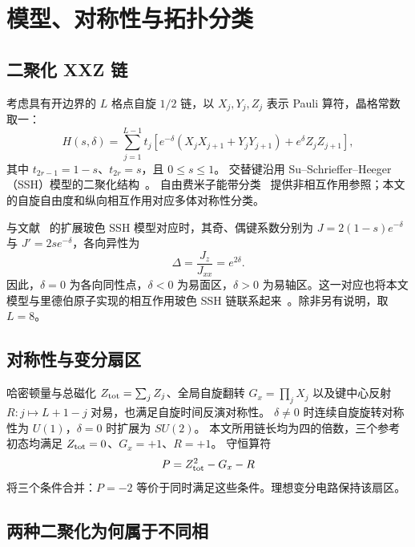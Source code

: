 \section{模型、对称性与拓扑分类}
\label{sec:model}

\subsection{二聚化 XXZ 链}

考虑具有开边界的 $L$ 格点自旋 $1/2$ 链，以 $X_j,Y_j,Z_j$ 表示 Pauli 算符，晶格常数取一：
\begin{equation}
H(s,\delta)=\sum_{j=1}^{L-1}t_j
\left[e^{-\delta}(X_jX_{j+1}+Y_jY_{j+1})
+e^\delta Z_jZ_{j+1}\right],
\label{eq:H}
\end{equation}
其中 $t_{2r-1}=1-s$、$t_{2r}=s$，且 $0\leq s\leq1$。
交替键沿用 Su--Schrieffer--Heeger（SSH）模型的二聚化结构~\cite{su1979solitons}。
自由费米子能带分类~\cite{ryu2010topological} 提供非相互作用参照；本文的自旋自由度和纵向相互作用对应多体对称性分类。

与文献~\cite{elben2020manybody} 的扩展玻色 SSH 模型对应时，其奇、偶键系数分别为 $J=2(1-s)e^{-\delta}$ 与 $J'=2se^{-\delta}$，各向异性为
\begin{equation}
\Delta=\frac{J_z}{J_{xx}}=e^{2\delta}.
\label{eq:anisotropy}
\end{equation}
因此，$\delta=0$ 为各向同性点，$\delta<0$ 为易面区，$\delta>0$ 为易轴区。这一对应也将本文模型与里德伯原子实现的相互作用玻色 SSH 链联系起来~\cite{deleseleuc2019observation}。除非另有说明，取 $L=8$。

\subsection{对称性与变分扇区}

哈密顿量与总磁化 $Z_{\rm tot}=\sum_jZ_j$、全局自旋翻转 $G_x=\prod_jX_j$ 以及键中心反射 $R:j\mapsto L+1-j$ 对易，也满足自旋时间反演对称性。
$\delta\neq0$ 时连续自旋旋转对称性为 $U(1)$，$\delta=0$ 时扩展为 $SU(2)$。
本文所用链长均为四的倍数，三个参考初态均满足 $Z_{\rm tot}=0$、$G_x=+1$、$R=+1$。
守恒算符
\begin{equation}
P=Z_{\rm tot}^2-G_x-R
\end{equation}
将三个条件合并：$P=-2$ 等价于同时满足这些条件。理想变分电路保持该扇区。

\subsection{两种二聚化为何属于不同相}

